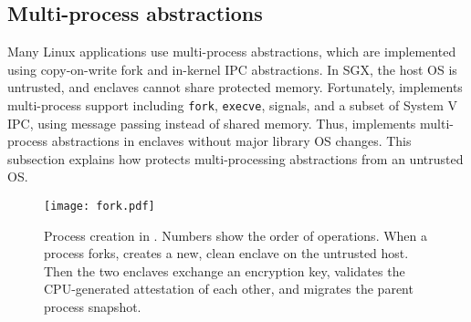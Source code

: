 \subsection{Multi-process abstractions}
\label{sec:sgx:shield:multiproc}

Many Linux applications use multi-process abstractions,
which are implemented using copy-on-write fork and in-kernel
IPC abstractions.
In SGX, the host OS is untrusted, and enclaves cannot share protected memory.
Fortunately, \graphene{} implements multi-process support
including {\tt fork}, {\tt execve}, signals, and a subset of System V IPC,
using message passing instead of shared memory.
Thus, \graphenesgx{} implements multi-process abstractions in enclaves
without major library OS changes.
This subsection explains how
\graphenesgx{} protects
 multi-processing abstractions from an untrusted OS.







\begin{figure}[t!]
\centering
\texttt{[image: fork.pdf]}
\caption{Process creation in \graphenesgx{}.
Numbers show the order of operations.
When a process forks, \graphenesgx{} creates a new, clean enclave
on the untrusted host.
Then the two enclaves %
exchange an encryption key, validates the CPU-generated attestation of each other,
and migrates the parent process snapshot.}
\label{fig:fork}
\end{figure}

